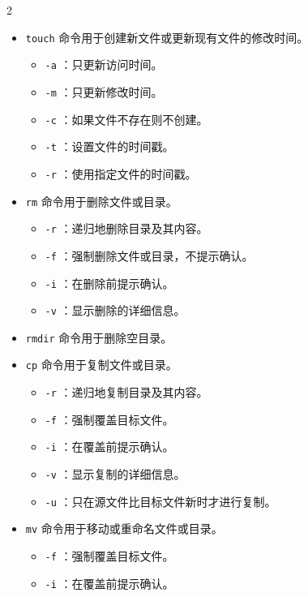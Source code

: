 \begin{multicols}{2}
\begin{itemize}
\begin{itemize}
            \end{itemize}
        \item  \texttt{touch} 命令用于创建新文件或更新现有文件的修改时间。
            \begin{itemize}
                \item  \texttt{-a} ：只更新访问时间。
                \item  \texttt{-m} ：只更新修改时间。
                \item  \texttt{-c} ：如果文件不存在则不创建。
                \item  \texttt{-t} ：设置文件的时间戳。
                \item  \texttt{-r} ：使用指定文件的时间戳。
            \end{itemize}
        \item  \texttt{rm} 命令用于删除文件或目录。
            \begin{itemize}
                \item  \texttt{-r} ：递归地删除目录及其内容。
                \item  \texttt{-f} ：强制删除文件或目录，不提示确认。
                \item  \texttt{-i} ：在删除前提示确认。
                \item  \texttt{-v} ：显示删除的详细信息。
            \end{itemize}
        \item  \texttt{rmdir} 命令用于删除空目录。
        \item  \texttt{cp} 命令用于复制文件或目录。
            \begin{itemize}
                \item  \texttt{-r} ：递归地复制目录及其内容。
                \item  \texttt{-f} ：强制覆盖目标文件。
                \item  \texttt{-i} ：在覆盖前提示确认。
                \item  \texttt{-v} ：显示复制的详细信息。
                \item  \texttt{-u} ：只在源文件比目标文件新时才进行复制。
            \end{itemize}
        \item  \texttt{mv} 命令用于移动或重命名文件或目录。
            \begin{itemize}
                \item  \texttt{-f} ：强制覆盖目标文件。
                \item  \texttt{-i} ：在覆盖前提示确认。

\end{itemize}
\end{itemize}
\end{multicols}
